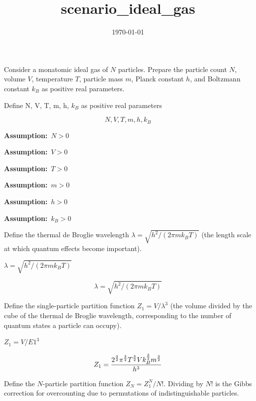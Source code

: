 \documentclass[dvipdfmx]{article}
\title{scenario\_ideal\_gas}
\date{\today}
\begin{document}
\maketitle

Consider a monatomic ideal gas of $N$ particles. Prepare the particle count $N$, volume $V$, temperature $T$, particle mass $m$, Planck constant $h$, and Boltzmann constant $k_B$ as positive real parameters.

Define N, V, T, m, h, $k_B$ as positive real parameters

\[
  N, V, T, m, h, k_B
\]

\noindent\textbf{Assumption:}\ $\displaystyle N > 0$\par

\noindent\textbf{Assumption:}\ $\displaystyle V > 0$\par

\noindent\textbf{Assumption:}\ $\displaystyle T > 0$\par

\noindent\textbf{Assumption:}\ $\displaystyle m > 0$\par

\noindent\textbf{Assumption:}\ $\displaystyle h > 0$\par

\noindent\textbf{Assumption:}\ $\displaystyle k_B > 0$\par

Define the thermal de Broglie wavelength $\lambda=\sqrt{h^2/(2\pi mk_BT)}$ (the length scale at which quantum effects become important).

$\lambda = \sqrt{h^2 / (2 \pi m k_B T)}$

\begin{equation}
  \lambda = \sqrt{h^2 / (2 \pi m k_B T)}
  \label{eq:E1}
\end{equation}

Define the single-particle partition function $Z_1=V/\lambda^3$ (the volume divided by the cube of the thermal de Broglie wavelength, corresponding to the number of quantum states a particle can occupy).

$Z_1 = V / E1^3$

\begin{equation}
  Z_1 = {{2^{\frac{3}{2}} \pi^{\frac{3}{2}} T^{\frac{3}{2}} V k_{B}^{\frac{3}{2}} m^{\frac{3}{2}}}\over{h^3}}
  \label{eq:E2}
\end{equation}

Define the $N$-particle partition function $Z_N=Z_1^N/N!$. Dividing by $N!$ is the Gibbs correction for overcounting due to permutations of indistinguishable particles.
\end{document}
